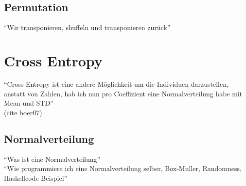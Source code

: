         \subsection{Permutation}
            ``Wir transponieren, shuffeln und transponieren zurück''

    \section{Cross Entropy}
        ``Cross Entropy ist eine andere Möglichkeit um die Individuen darzustellen, anstatt von Zahlen, hab ich nun pro Coeffizient eine Normalverteilung habe mit Mean und STD'' \\
        (cite boer07)
        \subsection{Normalverteilung}
            ``Was ist eine Normalverteilung'' \\
            ``Wie programmiere ich eine Normalverteilung selber, Box-Muller, Randomness, Haskellcode Beispiel'' \\
